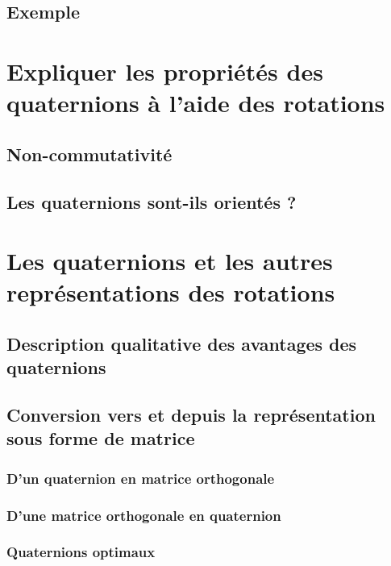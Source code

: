 	\subsection{Exemple}
		
	
\section{Expliquer les propriétés des quaternions à l'aide des rotations}
	\subsection{Non-commutativité}
		
	\subsection{Les quaternions sont-ils orientés ?}
		
	
\section{Les quaternions et les autres représentations des rotations}
	\subsection{Description qualitative des avantages des quaternions}
		
	\subsection{Conversion vers et depuis la représentation sous forme de matrice}
		\subsubsection{D'un quaternion en matrice orthogonale}
			
		\subsubsection{D'une matrice orthogonale en quaternion}
			
		\subsubsection{Quaternions optimaux}
			

